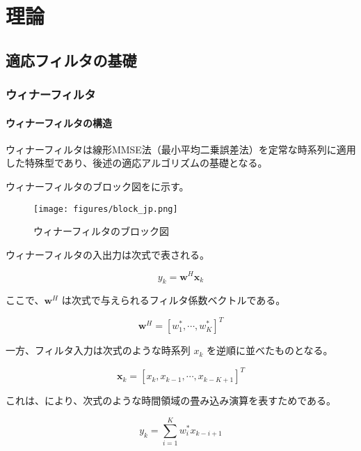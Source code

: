 \chapter{理論}\label{theory}

\section{適応フィルタの基礎}\label{basis-adf}

\subsection{ウィナーフィルタ}\label{wiener}

\subsubsection{ウィナーフィルタの構造}\label{wiener-structure}

ウィナーフィルタは線形MMSE法（最小平均二乗誤差法）を定常な時系列に適用した特殊型であり、後述の適応アルゴリズムの基礎となる。

ウィナーフィルタのブロック図をに示す。

\begin{figure}[H]
\centering
\texttt{[image: figures/block\_jp.png]}
\caption{ウィナーフィルタのブロック図}
\label{block_jp}
\end{figure}


ウィナーフィルタの入出力は次式で表される。

\begin{equation}
y_k = \bm{w}^H \bm{x}_k
\label{simple_y}
\end{equation}

ここで、\( \bm{w}^H\) は次式で与えられるフィルタ係数ベクトルである。

\begin{equation}
\bm{w}^H = [w_1^*, \cdots, w_{K}^*]^T
\end{equation}

一方、フィルタ入力は次式のような時系列 \({x_k}\)
を逆順に並べたものとなる。

\begin{equation}
\bm{x}_k = [x_k, x_{k-1}, \cdots, x_{k-K+1}]^T
\end{equation}

これは、により、次式のような時間領域の畳み込み演算を表すためである。

\begin{equation}
y_k = \sum_{i=1}^K w_i^* x_{k-i+1}
\end{equation}


